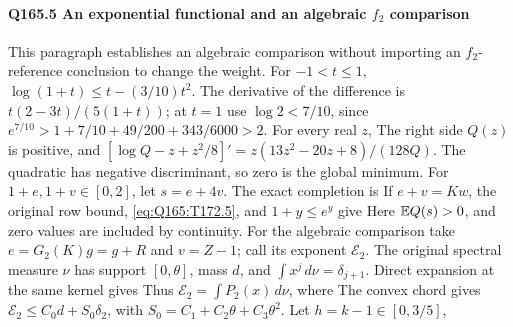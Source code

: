 \paragraph{Q165.5 An exponential functional and an algebraic $f_2$ comparison}\label{part:Q165.5}
This paragraph establishes an algebraic comparison without importing an
$f_2$-reference conclusion to change the weight.
For $-1<\allowbreak t\le\allowbreak 1$, $\log(1+t)\le\allowbreak  t-(3/10)t^2$.
The derivative of the difference is $t(2-3t)/(5(1+t))$;
at $t=\allowbreak 1$ use $\log2<\allowbreak 7/10$, since
$e^{7/10}>\allowbreak 1+7/10+49/200+343/6000>\allowbreak 2$.
For every real $z$,
The right side $Q(z)$ is positive, and
$[\log Q-z+z^2/8]'=\allowbreak z(13z^2-20z+8)/(128Q)$.
The quadratic has negative discriminant, so zero is the global minimum.
For $1+e,\allowbreak 1+v\in[0,\allowbreak 2]$, let $s=\allowbreak e+4v$. The exact completion is
If $e+v=\allowbreak Kw$, the original row bound, \eqref{eq:Q165:T172.5}, and
$1+y\le\allowbreak  e^y$ give
Here $\mathbb E Q(s)>\allowbreak 0$, and zero values are included by continuity.
For the algebraic comparison take $e=\allowbreak G_2(K)g=\allowbreak g+R$ and $v=\allowbreak Z-1$;
call its exponent $\mathcal E_2$. The original spectral measure $\nu$
has support $[0,\allowbreak \theta]$, mass $d$, and
$\int x^j\,\allowbreak d\nu=\allowbreak \delta_{j+1}$. Direct expansion at the same kernel gives
Thus $\mathcal E_2=\allowbreak \int P_2(x)\,\allowbreak d\nu$, where
The convex chord gives $\mathcal E_2\le\allowbreak  C_0d+S_0\delta_2$, with
$S_0=\allowbreak C_1+C_2\theta+C_3\theta^2$. Let $h=\allowbreak k-1\in[0,\allowbreak 3/5]$,
